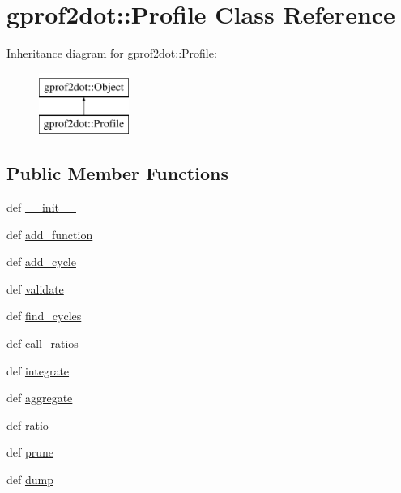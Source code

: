 \hypertarget{classgprof2dot_1_1Profile}{
\section{gprof2dot::Profile Class Reference}
\label{classgprof2dot_1_1Profile}
}
Inheritance diagram for gprof2dot::Profile:\begin{figure}[H]
\begin{center}
\leavevmode
\includegraphics[height=2.000000cm]{classgprof2dot_1_1Profile}
\end{center}
\end{figure}
\subsection*{Public Member Functions}
\begin{DoxyCompactItemize}
\item 
def \hyperlink{classgprof2dot_1_1Profile_a382a908aa54d329efa5a665de49b6913}{\_\-\_\-init\_\-\_\-}
\item 
def \hyperlink{classgprof2dot_1_1Profile_a04f4c5fa4b4bbf899fc90bfef2a827d3}{add\_\-function}
\item 
def \hyperlink{classgprof2dot_1_1Profile_a8fec12fa856f30c5430589634868456b}{add\_\-cycle}
\item 
def \hyperlink{classgprof2dot_1_1Profile_a04540c21937c3a4168983cb42d3ae33e}{validate}
\item 
def \hyperlink{classgprof2dot_1_1Profile_a80c3d1c49078c21e735930ff9e5eb88d}{find\_\-cycles}
\item 
def \hyperlink{classgprof2dot_1_1Profile_adfbd8866a3273a74485fa90dd9d784f1}{call\_\-ratios}
\item 
def \hyperlink{classgprof2dot_1_1Profile_a949fec672edcb92a63ce70dcedddb2bc}{integrate}
\item 
def \hyperlink{classgprof2dot_1_1Profile_abef5930211709a1efc06a03a71a0cc33}{aggregate}
\item 
def \hyperlink{classgprof2dot_1_1Profile_a6ed8ba8c0de35b973f292865dec31dda}{ratio}
\item 
def \hyperlink{classgprof2dot_1_1Profile_af08be21037ea945c2f5d76034c8aa388}{prune}
\item 
def \hyperlink{classgprof2dot_1_1Profile_a9aeda2770f7281ade06a77a0bb26bfcc}{dump}
\end{DoxyCompactItemize}
